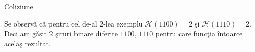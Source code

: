 \begin{problem}{Coliziune}
\Examples

\begin{example}
%
%
\end{example}

\Explanations

Se observ\u{a} c\u{a} pentru cel de-al $2$-lea exemplu $\mathcal{H}(1100) = 2$ \c{s}i $\mathcal{H}(1110) = 2$. Deci am g\u{a}sit $2$ \c{s}iruri binare diferite $1100$, $1110$ pentru care func\c{t}ia \^{i}ntoarce acela\c{s} rezultat.

\end{problem}
